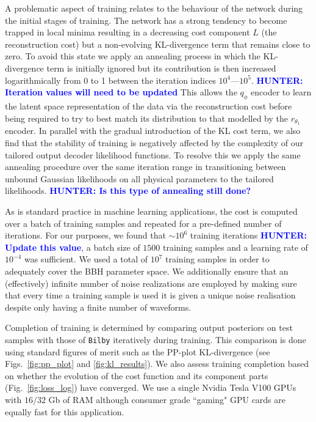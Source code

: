 \documentclass[%
showpacs,
nofootinbib,
 amsmath,amssymb,
 aps,
 twocolumn,
 prl,
 reprint,
floatfix,
]{revtex4-1}
\newcommand{\hunter}[1]{\textbf{\textcolor{blue}{HUNTER: #1}}}
\begin{document}
%
%
A problematic aspect of training relates to the behaviour of the network
during the initial stages of training. The network has a strong tendency to
become trapped in local minima resulting in a decreasing cost component $L$
(the reconstruction cost) but a non-evolving \ac{KL}-divergence term that
remains close to zero. To avoid this state we apply an annealing process in
which the \ac{KL}-divergence term is initially ignored but its contribution is
then increased logarithmically from 0 to 1 between the iteration indices
$10^4$---$10^5$. \hunter{Iteration values will need to be updated}
 This allows the $q_{\phi}$ encoder to learn the latent space
representation of the data via the reconstruction cost before being required to
try to best match its distribution to that modelled by the $r_{\theta_1}$
encoder. In parallel with the gradual introduction of the \ac{KL} cost term, we
also find that the stability of training is negatively affected by the
complexity of our tailored output decoder likelihood functions. To resolve this
we apply the same annealing procedure over the same iteration range in transitioning
between unbound Gaussian likelihoods on all physical parameters to the tailored
likelihoods.   \hunter{Is this type of annealing still done?}

%
%
As is standard practice in machine learning applications, the cost is computed
over a batch of training samples and repeated for a pre-defined number of
iterations. For our purposes, we found that $\sim 10^6$ training
iterations \hunter{Update this value}, a batch size of $1500$ training samples and a learning rate of
$10^{-4}$ was sufficient. We used a total of $10^7$ training samples in order
to adequately cover the \ac{BBH} parameter space. We additionally ensure that
an (effectively) infinite number of noise realizations are employed by making
sure that every time a training sample is used it is given a unique noise
realisation despite only having a finite number of waveforms.

%
%
Completion of training is determined by comparing output posteriors on test
samples with those of \texttt{Bilby} iteratively during training. This
comparison is done using standard figures of merit such as the \ac{PP}-plot
\ac{KL}-divergence (see Figs.~\ref{fig:pp_plot} and
\ref{fig:kl_results}). We also assess training completion based on whether the
evolution of the cost function and its component parts
(Fig.~\ref{fig:loss_log}) have converged. We use a single Nvidia Tesla V100
\acp{GPU} with $16/32$ Gb of RAM although consumer grade ``gaming" \ac{GPU}
cards are equally fast for this application.
\end{document}
